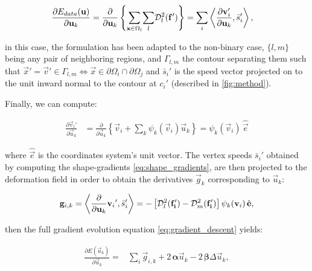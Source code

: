   \begin{align}
  \frac{\partial E_{data}(\vec{u})}{\partial \vec{u}_k} &=
  \frac{ \partial }{\partial \vec{u}_k} \left\{
   \underset{\vec{x} \in \Omega_l}{\sum} \underset{l}{\sum} \mdist{f'}{l} \right\}
  = \underset{i}{\sum}
   \left\langle \frac{\partial \vec{v}_i'}{\partial \vec{u}_k}, \bar{s}_i'\right\rangle,
  \label{eq:gradient_wshape}
  \end{align}

  in this case, the formulation has been adapted to the non-binary case, $\{l,m\}$
    being any pair of neighboring regions, and $\Gamma_{l,m}$ the contour separating
    them such that
    $\vec{x}' = \vec{v}' \in\Gamma_{l,m} \iff \vec{x}\in \partial\Omega_i \cap \partial\Omega_j$
    and $\bar{s}_i'$ is the speed vector projected on to the unit inward normal to the contour
    at $c_i'$ (described in \autoref{fig:method}).


Finally, we can compute:

  \begin{align}
  \frac{\partial \vec{v}_i'}{\partial \vec{u}_k} &= \frac{\partial}{\partial \vec{u}_k}
  \left\{ \vec{v}_i + \sum_k \psi_k(\vec{v}_i) \vec{u}_k \right\}
  = \psi_k(\vec{v}_i)\, \hat{\vec{e}}
  \label{eq:basis_derivative}
  \end{align}

  where $\hat{\vec{e}}$ is the coordinates system's unit vector.
The vertex speeds $\bar{s}_i'$ obtained by computing the shape-gradients \eqref{eq:shape_gradients},
	are then projected to the deformation field in order to obtain the derivatives $\vec{g}_k$
	corresponding to $\vec{u}_k$:

  \begin{equation}
  \vec{g}_{i,k} = \left\langle \frac{\partial}{\partial \vec{u}_k}{\vec{v}_i}', \bar{s}_i'\right\rangle
  = - \left[ \mdist{f_i'}{l} - \mdist{f_i'}{m} \right] \psi_k(\vec{v}_i)\, \hat{\vec{e}},
  \end{equation}

  then the full gradient evolution equation \eqref{eq:gradient_descent} yields:

  \begin{align}
  \frac{\partial E(\vec{u}_k)}{\partial \vec{u}_k} =
  &\underset{i}{\sum} \vec{g}_{i,k} +2\, \boldsymbol{\alpha} \vec{u}_k
  -2\, \boldsymbol{\beta} \Delta \vec{u}_k,
  \label{eq:gradient_final}
  \end{align}


